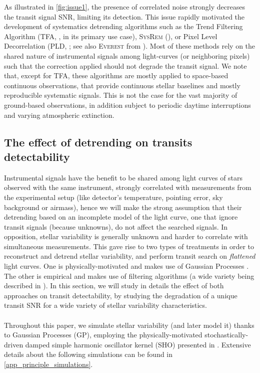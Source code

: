 \documentclass{aastex631}
\begin{document}
As illustrated in \autoref{fig:issue1}, the presence of correlated noise strongly decreases the transit signal SNR, limiting its detection. This issue rapidly motivated the development of systematics detrending algorithms such as the Trend Filtering Algorithm (\textsc{TFA}, \citealt{tfa}, in its primary use case), \textsc{SysRem} (\citealt{sysrem}), or Pixel Level Decorrelation (\textsc{PLD}, \citealt{pld}; see also \textsc{Everest} from \citealt{everest1, everest2}). Most of these methods rely on the shared nature of instrumental signals among light-curves (or neighboring pixels) such that the correction applied should not degrade the transit signal. We note that, except for \textsc{TFA}, these algorithms are mostly applied to space-based continuous observations, that provide continuous stellar baselines and mostly reproducible systematic signals. This is not the case for the vast majority of ground-based observations, in addition subject to periodic daytime interruptions and varying atmospheric extinction.

\subsection{The effect of detrending on transits detectability}\label{detrending_effect}

Instrumental signals have the benefit to be shared among light curves of stars observed with the same instrument, strongly correlated with measurements from the experimental setup (like detector's temperature, pointing error, sky background or airmass), hence we will make the strong assumption that their detrending based on an incomplete model of the light curve, one that ignore transit signals (because unknowns), do not affect the searched signals. In opposition, stellar variability is generally unknown and harder to correlate with simultaneous measurements. This gave rise to two types of treatments in order to reconstruct and detrend stellar variability, and perform transit search on \textit{flattened} light curves. One is physically-motivated and makes use of Gaussian Processes \citep[e.g.]{k2sc}. The other is empirical and makes use of filtering algorithms (a wide variety being described in \cite{wotan}). In this section, we will study in details the effect of both approaches on transit detectability, by studying the degradation of a unique transit SNR for a wide variety of stellar variability characteristics.
\\\\
Throughout this paper, we simulate stellar variability (and later model it) thanks to Gaussian Processes (GP), employing the physically-motivated stochastically-driven damped simple harmonic oscillator kernel (SHO) presented in \citealt{celerite1}. Extensive details about the following simulations can be found in \autoref{app_principle_simulations}.
\end{document}
